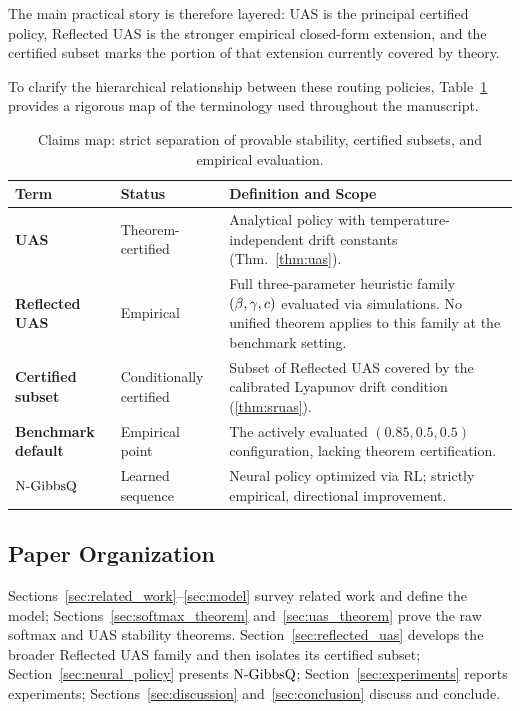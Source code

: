 The main practical story is therefore layered: UAS is the principal certified policy, Reflected UAS is the stronger empirical closed-form extension, and the certified subset marks the portion of that extension currently covered by theory.

To clarify the hierarchical relationship between these routing policies, Table~\ref{tab:claims_map} provides a rigorous map of the terminology used throughout the manuscript.

\begin{table}[htbp]
\centering
\small
\caption{Claims map: strict separation of provable stability, certified subsets, and empirical evaluation.}
\label{tab:claims_map}
\renewcommand{\arraystretch}{1.25}
\begin{tabular}{@{} l l p{80mm} @{}}
\toprule
\textbf{Term} & \textbf{Status} & \textbf{Definition and Scope} \\
\midrule
\textbf{UAS} & Theorem-certified & Analytical policy with temperature-independent drift constants (Thm.~\ref{thm:uas}). \\
\addlinespace[3pt]
\textbf{Reflected UAS} & Empirical & Full three-parameter heuristic family $(\beta,\gamma,c)$ evaluated via simulations. No unified theorem applies to this family at the benchmark setting. \\
\addlinespace[3pt]
\textbf{Certified subset} & Conditionally certified & Subset of Reflected UAS covered by the calibrated Lyapunov drift condition (\cref{thm:sruas}). \\
\addlinespace[3pt]
\textbf{Benchmark default} & Empirical point & The actively evaluated $(0.85, 0.5, 0.5)$ configuration, lacking theorem certification. \\
\textbf{$\text{N-GibbsQ}$} & Learned sequence & Neural policy optimized via RL; strictly empirical, directional improvement. \\
\bottomrule
\end{tabular}
\end{table}

\subsection{Paper Organization}
Sections~\ref{sec:related_work}--\ref{sec:model} survey related work and define the model; Sections~\ref{sec:softmax_theorem} and~\ref{sec:uas_theorem} prove the raw softmax and UAS stability theorems.
Section~\ref{sec:reflected_uas} develops the broader Reflected UAS family and then isolates its certified subset; Section~\ref{sec:neural_policy} presents $\text{N-GibbsQ}$; Section~\ref{sec:experiments} reports experiments; Sections~\ref{sec:discussion} and~\ref{sec:conclusion} discuss and conclude.

